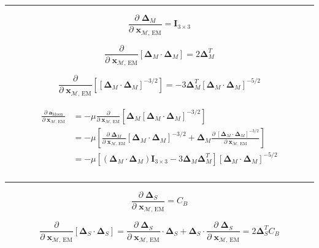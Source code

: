 \documentclass[]{article}
\newcommand{\pd}[2]{\frac{\partial\;#1}{\partial\;#2}}
\newcommand{\pddown}[2]{\frac{\partial}{\partial\;#2} \left[ #1 \right] }
\begin{document}
	\hrule \vspace{1em}
	
	\begin{equation*}
		\pd{\boldsymbol{\Delta}_M}{\mathbf{x}_{\mathcal{M}\text{, EM}}} = \mathbf{I}_{3\times 3}
	\end{equation*}
	
	\begin{equation*}
		\pddown{\boldsymbol{\Delta}_M \cdot \boldsymbol{\Delta}_M}{\mathbf{x}_{\mathcal{M}\text{, EM}}} = 2 \boldsymbol{\Delta}_M^T
	\end{equation*}
	
	\begin{equation*}
		\pddown{ [\boldsymbol{\Delta}_M \cdot \boldsymbol{\Delta}_M ]^{-3/2} }{\mathbf{x}_{\mathcal{M}\text{, EM}}} = -3 \boldsymbol{\Delta}_M^T [\boldsymbol{\Delta}_M \cdot \boldsymbol{\Delta}_M ]^{-5/2}
	\end{equation*}
	
	\begin{align}
	\begin{split}
		\pd{\mathbf{a}_\text{Moon}}{ \mathbf{x}_{\mathcal{M}\text{, EM}} } 
		&= -\mu \pddown{ \boldsymbol{\Delta}_M [\boldsymbol{\Delta}_M\cdot\boldsymbol{\Delta}_M]^{-3/2} }{ \mathbf{x}_{\mathcal{M}\text{, EM}} } \\
		&= -\mu \left[ \pd{ \boldsymbol{\Delta}_M}{ \mathbf{x}_{\mathcal{M}\text{, EM}} }[\boldsymbol{\Delta}_M\cdot\boldsymbol{\Delta}_M]^{-3/2} + \boldsymbol{\Delta}_M \pd{ [\boldsymbol{\Delta}_M\cdot\boldsymbol{\Delta}_M]^{-3/2} }{ \mathbf{x}_{\mathcal{M}\text{, EM}} } \right] \\
		&= -\mu \left[ (\boldsymbol{\Delta}_M\cdot\boldsymbol{\Delta}_M) \mathbf{I}_{3\times 3} - 3 \boldsymbol{\Delta}_M \boldsymbol{\Delta}_M^T \right] [\boldsymbol{\Delta}_M \cdot \boldsymbol{\Delta}_M ]^{-5/2} \\
	\end{split}
	\end{align}
	
	\hrule \vspace{1em}
	
	\begin{equation*}
		\pd{\boldsymbol{\Delta}_S}{\mathbf{x}_{\mathcal{M}\text{, EM}}} = C_B
	\end{equation*}
	
	\begin{equation*}
		\pddown{\boldsymbol{\Delta}_S \cdot \boldsymbol{\Delta}_S}{\mathbf{x}_{\mathcal{M}\text{, EM}}} = \pd{\boldsymbol{\Delta}_S}{\mathbf{x}_{\mathcal{M}\text{, EM}}} \cdot \boldsymbol{\Delta}_S + \boldsymbol{\Delta}_S \cdot \pd{\boldsymbol{\Delta}_S}{\mathbf{x}_{\mathcal{M}\text{, EM}}} = 2 \boldsymbol{\Delta}_S^T C_B
	\end{equation*}
	
\end{document}
